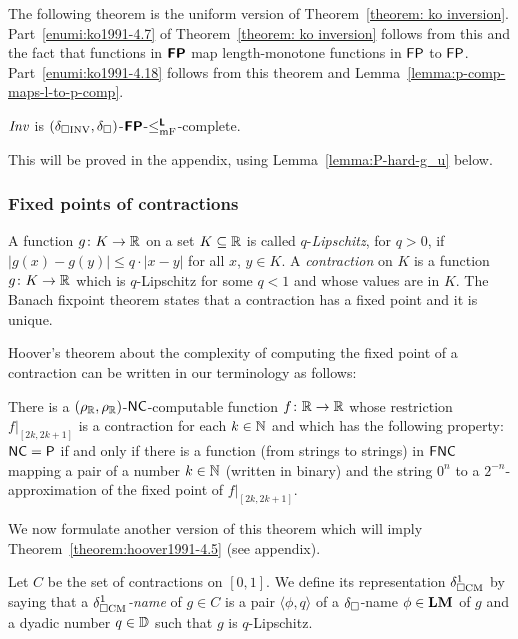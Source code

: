 \documentclass[envcountsame,orivec,oribibl]{llncs}
\begin{document}
The following theorem is the uniform version of Theorem~\ref{theorem: ko inversion}. 
Part~\ref{enumi:ko1991-4.7} of Theorem~\ref{theorem: ko inversion} follows from this and the fact that
functions in $\text{\bfseries \sffamily \upshape FP}$ map length-monotone functions in $\mathsf{FP}$ to $\mathsf{FP}$.
Part~\ref{enumi:ko1991-4.18} follows from this theorem and Lemma~\ref{lemma:p-comp-maps-l-to-p-comp}.

\begin{theorem}
 \label{theorem:INV-is-P-complete}
 $\mathit{Inv}$ is $(\delta _{\square \mathrm{INV}}, \delta _\square)$-$\text{\bfseries \sffamily \upshape FP}$-$\leq _{\mathrm{mF}} ^{\text{\bfseries \sffamily \upshape L}}$-complete.
\end{theorem}

This will be proved in the appendix, 
using 
Lemma~\ref{lemma:P-hard-g_u} below. 

\subsubsection{Fixed points of contractions}

A function $g \colon K \to \mathbb R$ on a set $K \subseteq \mathbb R$
is called $q$-\emph{Lipschitz}, for $q > 0$, 
if $
\lvert g (x) - g (y) \rvert \leq q \cdot \lvert x - y \rvert
$ for all $x$, $y \in K$. 
A \emph{contraction} on $K$ is 
a function $g \colon K \to \mathbb R$ which is $q$-Lipschitz for some $q < 1$
and whose values are in $K$. 
The Banach fixpoint theorem states that 
a contraction has a fixed point and it is unique. 

Hoover's theorem about the complexity of computing the fixed point
of a contraction can be written in our terminology as follows:

\begin{theorem}
\label{theorem:hoover1991-4.5}
 There is a $(\rho _\mathbb R, \rho _\mathbb R)$-$\mathsf{NC}$-computable function $f \colon \mathbb R \to \mathbb R$
 whose restriction $f|_{[2k, 2k+1]}$ is a contraction for each $k \in \mathbb N$ and
 which has the following property: 
 $\mathsf{NC} = \mathsf{P}$ if and only if 
 there is a function (from strings to strings) in $\mathsf{FNC}$ mapping 
 a pair of a number $k \in \mathbb N$ (written in binary) and the string $0^n$
 to a $2^{-n}$-approximation of the 
 fixed point of $f |_{[2k, 2k + 1]}$. 
\end{theorem}

We now formulate another version of this theorem which 
will imply Theorem~\ref{theorem:hoover1991-4.5}
(see appendix). 

Let $C$ be the set of contractions on $[0, 1]$. 
We define its representation $\delta _{\square \mathrm{CM}}^1$ by saying that 
a \emph{$\delta _{\square \mathrm{CM}}^1$-name} of $g \in C$
is a pair $\langle \phi, q \rangle$ of 
a $\delta _\square$-name $\phi \in \mathbf{LM}$ of $g$ 
and a dyadic number $q \in \mathbb D$ such that $g$ is $q$-Lipschitz. 
\end{document}
